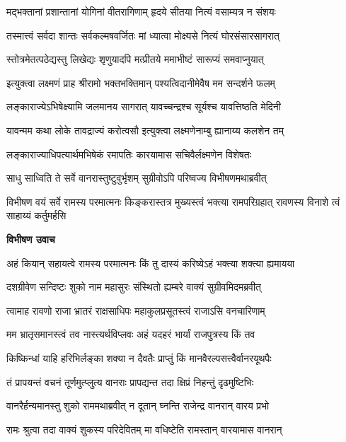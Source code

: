 \twolineshloka
{मद्भक्तानां प्रशान्तानां योगिनां वीतरागिणाम्}
{हृदये सीतया नित्यं वसाम्यत्र न संशयः} %

\twolineshloka
{तस्मात्त्वं सर्वदा शान्तः सर्वकल्मषवर्जितः}
{मां ध्यात्वा मोक्ष्यसे नित्यं घोरसंसारसागरात्} %

\twolineshloka
{स्तोत्रमेतत्पठेद्यस्तु लिखेद्यः शृणुयादपि}
{मत्प्रीतये ममाभीष्टं सारूप्यं समवाप्नुयात्} %

\twolineshloka
{इत्युक्त्वा लक्ष्मणं प्राह श्रीरामो भक्तभक्तिमान्}
{पश्यत्विदानीमेवैष मम सन्दर्शने फलम्} %

\twolineshloka
{लङ्काराज्येऽभिषेक्ष्यामि जलमानय सागरात्}
{यावच्चन्द्रश्च सूर्यश्च यावत्तिष्ठति मेदिनी} %

\twolineshloka
{यावन्मम कथा लोके तावद्राज्यं करोत्वसौ}
{इत्युक्त्वा लक्ष्मणेनाम्बु ह्यानाय्य कलशेन तम्} %

\twolineshloka
{लङ्काराज्याधिपत्यार्थमभिषेकं रमापतिः}
{कारयामास सचिवैर्लक्ष्मणेन विशेषतः} %

\twolineshloka
{साधु साध्विति ते सर्वे वानरास्तुष्टुवुर्भृशम्}
{सुग्रीवोऽपि परिष्वज्य विभीषणमथाब्रवीत्} %

\threelineshloka
{विभीषण वयं सर्वे रामस्य परमात्मनः}
{किङ्करास्तत्र मुख्यस्त्वं भक्त्या रामपरिग्रहात्}
{रावणस्य विनाशे त्वं साहाय्यं कर्तुमर्हसि} %

\textbf{विभीषण उवाच}

\twolineshloka
{अहं कियान् सहायत्वे रामस्य परमात्मनः}
{किं तु दास्यं करिष्येऽहं भक्त्या शक्त्या ह्यमायया} %

\twolineshloka
{दशग्रीवेण सन्दिष्टः शुको नाम महासुरः}
{संस्थितो ह्यम्बरे वाक्यं सुग्रीवमिदमब्रवीत्} %

\twolineshloka
{त्वामाह रावणो राजा भ्रातरं राक्षसाधिपः}
{महाकुलप्रसूतस्त्वं राजाऽसि वनचारिणाम्} %

\twolineshloka
{मम भ्रातृसमानस्त्वं तव नास्त्यर्थविप्लवः}
{अहं यदहरं भार्यां राजपुत्रस्य किं तव} %

\twolineshloka
{किष्किन्धां याहि हरिभिर्लङ्का शक्या न दैवतैः}
{प्राप्तुं किं मानवैरल्पसत्त्वैर्वानरयूथपैः} %

\twolineshloka
{तं प्रापयन्तं वचनं तूर्णमुत्प्लुत्य वानराः}
{प्रापद्यन्त तदा क्षिप्रं निहन्तुं दृढमुष्टिभिः} %

\twolineshloka
{वानरैर्हन्यमानस्तु शुको राममथाब्रवीत्}
{न दूतान् घ्नन्ति राजेन्द्र वानरान् वारय प्रभो} %

\twolineshloka
{रामः श्रुत्वा तदा वाक्यं शुकस्य परिदेवितम्}
{मा वधिष्टेति रामस्तान् वारयामास वानरान्} %

